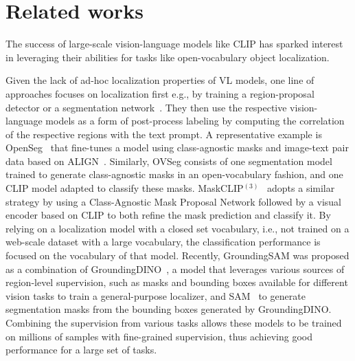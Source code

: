 \documentclass[10pt,twocolumn,letterpaper]{article}
\begin{document}
\section{Related works}
\label{sec:related_works}

The success of large-scale vision-language models like CLIP has sparked interest in leveraging their abilities for tasks like open-vocabulary object localization.

Given the lack of ad-hoc localization properties of VL models, one line of approaches focuses on localization first e.g., by training a region-proposal detector or a segmentation network~\citep{kirillov2023segment}. They then use the respective vision-language models as a form of post-process labeling by computing the correlation of the respective regions with the text prompt. 
A representative example is OpenSeg~\citep{ghiasi2022scaling} that fine-tunes a model using class-agnostic masks and image-text pair data based on ALIGN~\citep{jia2021scaling}. 
Similarly, OVSeg consists of one segmentation model trained to generate class-agnostic masks in an open-vocabulary fashion, and one CLIP model adapted to classify these masks. MaskCLIP$^{(3)}$~\citep{ding2022open} adopts a similar strategy by using a Class-Agnostic Mask Proposal Network followed by a visual encoder based on CLIP to both refine the mask prediction and classify it.
By relying on a localization model with a closed set vocabulary, i.e., not trained on a web-scale dataset with a large vocabulary, the classification performance is focused on the vocabulary of that model.
Recently, GroundingSAM was proposed as a combination of GroundingDINO~\citep{liu2023grounding}, a model that leverages various sources of region-level supervision, such as masks and bounding boxes available for different vision tasks to train a general-purpose localizer, and SAM~\citep{kirillov2023segment} to generate segmentation masks from the bounding boxes generated by GroundingDINO.
Combining the supervision from various tasks allows these models to be trained on millions of samples with fine-grained supervision, thus achieving good performance for a large set of tasks.
\end{document}
